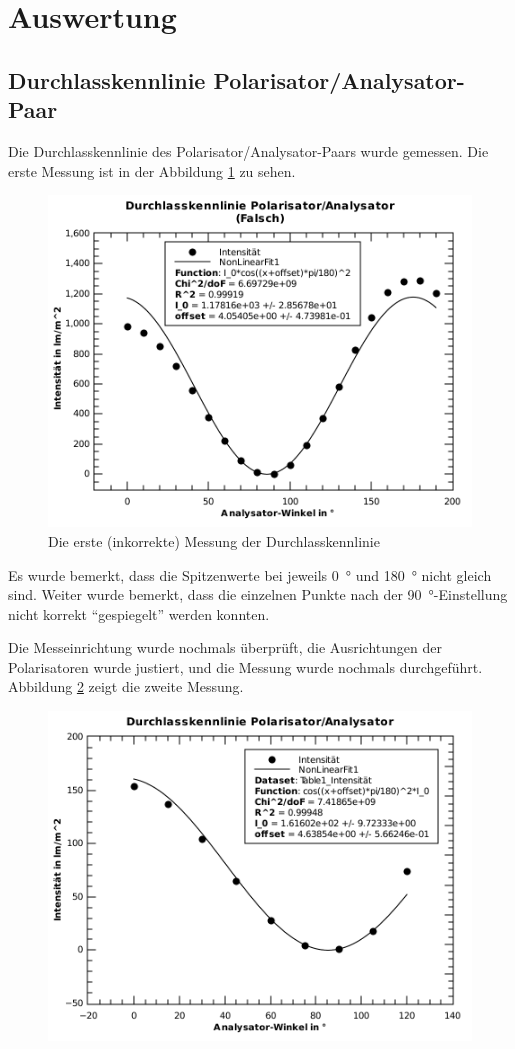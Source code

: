 \section{Auswertung}

\subsection{Durchlasskennlinie Polarisator/Analysator-Paar}

Die  Durchlasskennlinie  des Polarisator/Analysator-Paars  wurde  gemessen.  Die
erste   Messung  ist  in  der  Abbildung  \ref{fig:aufgabe-3_falsch}  zu  sehen.

\begin{figure}[H]
    \centering
    \includegraphics[width=.6\linewidth]{images/aufgabe-3_falsch.pdf}
    \caption{Die erste (inkorrekte) Messung der Durchlasskennlinie}
    \label{fig:aufgabe-3_falsch}
\end{figure}

Es  wurde  bemerkt,  dass  die  Spitzenwerte  bei  jeweils  \SI{0}{\degree}  und
\SI{180}{\degree} nicht gleich sind. Weiter wurde bemerkt,  dass  die  einzelnen
Punkte nach der \SI{90}{\degree}-Einstellung nicht korrekt ``gespiegelt'' werden
konnten.

Die  Messeinrichtung   wurde   nochmals  \"uberpr\"uft,  die  Ausrichtungen  der
Polarisatoren  wurde  justiert,  und die Messung wurde nochmals  durchgef\"uhrt.
Abbildung \ref{fig:aufgabe-3} zeigt die zweite Messung.

\begin{figure}[H]
    \centering
    \includegraphics[width=.6\linewidth]{images/aufgabe-3.pdf}
    \caption{}
    \label{fig:aufgabe-3}
\end{figure}

